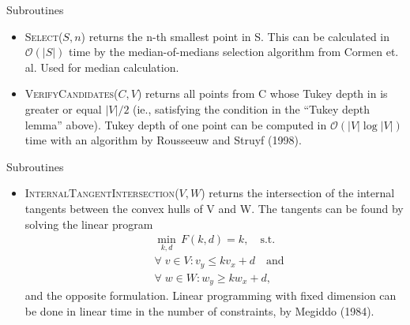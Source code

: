 \documentclass{beamer}
\newcommand{\order}[1]{\ensuremath{\mathcal{O}(#1)}}
\begin{document}
\begin{frame}{Subroutines}
  \begin{itemize}
  \item \textsc{Select}(\(S, n\)) returns the n-th smallest point in S. This can be calculated in
    \order{|S|} time by the median-of-medians selection algorithm from Cormen et. al. Used for
    median calculation.
  \item \textsc{VerifyCandidates}(\(C, V\)) returns all points from C whose Tukey depth in is
    greater or equal \(|V|/2\) (ie., satisfying the condition in the \enquote{Tukey depth lemma}
    above). Tukey depth of one point can be computed in \order{|V| \log |V|} time with an algorithm
    by Rousseeuw and Struyf (1998).
  \end{itemize}
\end{frame}


\begin{frame}{Subroutines}
  \begin{itemize}
  \item \textsc{InternalTangentIntersection}(\(V, W\)) returns the intersection of the internal
    tangents between the convex hulls of V and W. The tangents can be found by solving the linear
    program
    \begin{align*}
      &\min_{k, d}\, F(k, d) = k, \quad \text{s.t.}\\
      &\forall\; v \in V: v_y \leq k  v_x + d \quad \text{and} \\
      &\forall\; w \in W: w_y \geq k  w_x + d,
    \end{align*}
    and the opposite formulation. Linear programming with fixed dimension can be done in linear time
    in the number of constraints, by Megiddo (1984).
  \end{itemize}
\end{frame}
\end{document}
